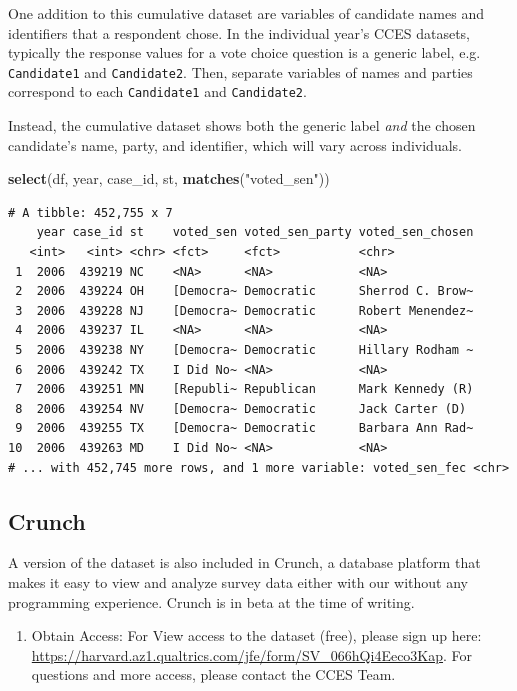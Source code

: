 \documentclass[10pt,article,oneside]{memoir}
\theoremstyle{definition}
\newenvironment{Shaded}{\begin{snugshade}}{\end{snugshade}}
\newcommand{\KeywordTok}[1]{\textcolor[rgb]{0.13,0.29,0.53}{\textbf{#1}}}
\newcommand{\StringTok}[1]{\textcolor[rgb]{0.31,0.60,0.02}{#1}}
\newcommand{\NormalTok}[1]{#1}
\begin{document}
One addition to this cumulative dataset are variables of candidate names
and identifiers that a respondent chose. In the individual year's CCES
datasets, typically the response values for a vote choice question is a
generic label, e.g. \texttt{Candidate1} and \texttt{Candidate2}. Then,
separate variables of names and parties correspond to each
\texttt{Candidate1} and \texttt{Candidate2}.

Instead, the cumulative dataset shows both the generic label \emph{and}
the chosen candidate's name, party, and identifier, which will vary
across individuals.

\begin{Shaded}
\begin{Highlighting}[]
\KeywordTok{select}\NormalTok{(df, year, case_id, st, }\KeywordTok{matches}\NormalTok{(}\StringTok{"voted_sen"}\NormalTok{))}
\end{Highlighting}
\end{Shaded}

\begin{verbatim}
# A tibble: 452,755 x 7
    year case_id st    voted_sen voted_sen_party voted_sen_chosen
   <int>   <int> <chr> <fct>     <fct>           <chr>           
 1  2006  439219 NC    <NA>      <NA>            <NA>            
 2  2006  439224 OH    [Democra~ Democratic      Sherrod C. Brow~
 3  2006  439228 NJ    [Democra~ Democratic      Robert Menendez~
 4  2006  439237 IL    <NA>      <NA>            <NA>            
 5  2006  439238 NY    [Democra~ Democratic      Hillary Rodham ~
 6  2006  439242 TX    I Did No~ <NA>            <NA>            
 7  2006  439251 MN    [Republi~ Republican      Mark Kennedy (R)
 8  2006  439254 NV    [Democra~ Democratic      Jack Carter (D) 
 9  2006  439255 TX    [Democra~ Democratic      Barbara Ann Rad~
10  2006  439263 MD    I Did No~ <NA>            <NA>            
# ... with 452,745 more rows, and 1 more variable: voted_sen_fec <chr>
\end{verbatim}

\subsection{Crunch}\label{crunch}

A version of the dataset is also included in Crunch, a database platform
that makes it easy to view and analyze survey data either with our
without any programming experience. Crunch is in beta at the time of
writing.

\begin{enumerate}
\def\labelenumi{\arabic{enumi}.}
\tightlist
\item
  Obtain Access: For View access to the dataset (free), please sign up
  here:
  \url{https://harvard.az1.qualtrics.com/jfe/form/SV_066hQi4Eeco3Kap}.
  For questions and more access, please contact the CCES Team.
\end{enumerate}
\end{document}
